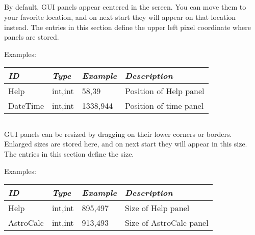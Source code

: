 \subsection{}

By default, GUI panels appear centered in the screen. You can move them to your favorite location, 
and on next start they will appear on that location instead.
The entries in this section define the upper left pixel coordinate where panels are stored.

Examples:

\noindent%
\begin{tabularx}{\textwidth}{l|l|l|X}
\toprule
\emph{ID}     & \emph{Type} & \emph{Example}&\emph{Description}     \\\midrule
Help          & int,int     &  58,39        & Position of Help panel\\%
DateTime      & int,int     &  1338,944     & Position of time panel\\\bottomrule
\end{tabularx}


\subsection{}

GUI panels can be resized by dragging on their lower corners or borders.  
Enlarged sizes are stored here, and on next start they will appear in this size.
The entries in this section define the size.

Examples:

\noindent%
\begin{tabularx}{\textwidth}{l|l|l|X}
\toprule
\emph{ID}     & \emph{Type} & \emph{Example}&\emph{Description}      \\\midrule
Help          & int,int     &  895,497      & Size of Help panel     \\%
AstroCalc     & int,int     &  913,493      & Size of AstroCalc panel\\\bottomrule
\end{tabularx}


\subsection{}
\label{sec:config.ini:hips}

